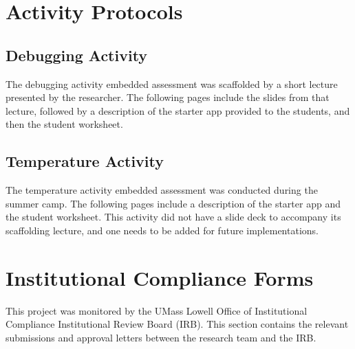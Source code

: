 \chapter{Activity Protocols}

\section{Debugging Activity}
The debugging activity embedded assessment was scaffolded by a short lecture presented by the researcher. The following pages include the slides from that lecture, followed by a description of the starter app provided to the students, and then the student worksheet.


\label{apx:debugging-protocol}

\section{Temperature Activity}
The temperature activity embedded assessment was conducted during the summer camp. The following pages include a description of the starter app and the student worksheet. This activity did not have a slide deck to accompany its scaffolding lecture, and one needs to be added for future implementations.

\label{apx:temperature-protocol}

\chapter{Institutional Compliance Forms}
This project was monitored by the UMass Lowell Office of Institutional Compliance Institutional Review Board (IRB). This section contains the relevant submissions and approval letters between the research team and the IRB.



